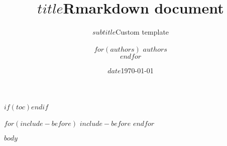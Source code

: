 \documentclass[a4paper, 12pt]{article}
\title{$title$}
\title{Rmarkdown document}
\subtitle{$subtitle$}
\subtitle{Custom template}
\author{$for(authors)$ \textsc{$authors$}\\ $endfor$}
\institute{$institute$}
\institute{Université catholique de Louvain}
\date{$date$}
\date{\today}
\begin{document}
    \maketitle
    $if(toc)$\tableofcontents$endif$
    \newpage

    $for(include-before)$
        $include-before$
    $endfor$


    $body$
\end{document}
